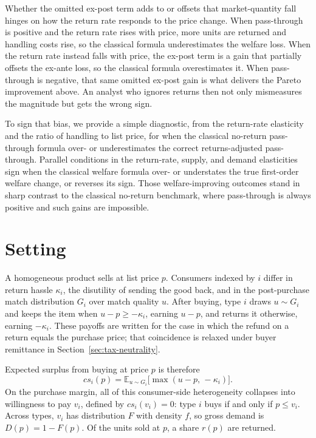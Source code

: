 \documentclass[11pt]{article}
\begin{document}
Whether the omitted ex-post term adds to or offsets that market-quantity fall
hinges on how the return rate responds to the price change.  When
pass-through is positive and the return rate rises with price, more units are
returned and handling costs rise, so the classical formula underestimates the
welfare loss.  When the return rate instead falls with price, the ex-post
term is a gain that partially offsets the ex-ante loss, so the classical
formula overestimates it.  When pass-through is negative, that same omitted
ex-post gain is what delivers the Pareto improvement above.  An analyst who
ignores returns then not only mismeasures the magnitude but gets the wrong
sign.

To sign that bias, we provide a simple diagnostic, from the return-rate
elasticity and the ratio of handling to list price, for when the classical
no-return pass-through formula over- or underestimates the correct
returns-adjusted pass-through.  Parallel conditions in the return-rate,
supply, and demand elasticities sign when the classical welfare formula over-
or understates the true first-order welfare change, or reverses its sign.
Those welfare-improving outcomes stand in sharp contrast to the classical
no-return benchmark, where pass-through is always positive and such gains are
impossible.

\section{Setting}

A homogeneous product sells at list price $p$.  Consumers indexed by $i$ differ
in return hassle $\kappa_i$, the disutility of sending the good back, and in
the post-purchase match distribution $G_i$ over match quality $u$.  After
buying, type $i$ draws $u\sim G_i$ and keeps the item when
$u-p\geq -\kappa_i$, earning $u-p$, and returns it otherwise, earning
$-\kappa_i$.  These payoffs are written for the case in which the refund on a
return equals the purchase price; that coincidence is relaxed under buyer
remittance in Section~\ref{sec:tax-neutrality}.

Expected surplus from buying at price $p$ is therefore
\[
  cs_i(p)=\mathbb{E}_{u\sim G_i}\bigl[\max(u-p,\,-\kappa_i)\bigr].
\]
On the purchase margin, all of this consumer-side heterogeneity collapses into
willingness to pay $v_i$, defined by $cs_i(v_i)=0$: type $i$ buys if and only
if $p\leq v_i$.  Across types, $v_i$ has distribution $F$ with density $f$, so
gross demand is $D(p)=1-F(p)$.  Of the units sold at $p$, a share $r(p)$ are
returned.
\end{document}
